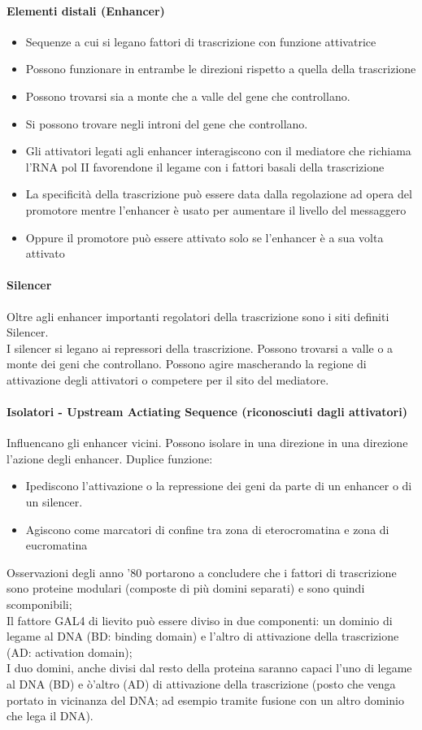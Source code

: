 \documentclass{article}
\begin{document}
\paragraph{Elementi distali (Enhancer)}
\begin{itemize}
    \item Sequenze a cui si legano fattori di trascrizione con funzione attivatrice
    \item Possono funzionare in entrambe le direzioni rispetto a quella della trascrizione
    \item Possono trovarsi sia a monte che a valle del gene che controllano.
    \item Si possono trovare negli introni del gene che controllano.
    \item Gli attivatori legati agli enhancer interagiscono con il mediatore che richiama l'RNA pol II favorendone il legame con i fattori basali della trascrizione
    \item La specificità della trascrizione può essere data dalla regolazione ad opera del promotore mentre l'enhancer è usato per aumentare il livello del messaggero
    \item Oppure il promotore può essere attivato solo se l'enhancer è a sua volta attivato
\end{itemize}
\paragraph{Silencer}
Oltre agli enhancer importanti regolatori della trascrizione sono i siti definiti Silencer.\\
I silencer si legano ai repressori della trascrizione. Possono trovarsi a valle o a monte dei geni che
controllano. Possono agire mascherando la regione di attivazione degli attivatori o competere per il sito del mediatore.
\paragraph{Isolatori - Upstream Actiating Sequence (riconosciuti dagli attivatori)}
Influencano gli enhancer vicini. Possono isolare in una direzione in una direzione l'azione degli enhancer.
Duplice funzione:
\begin{itemize}
    \item Ipediscono l'attivazione o la repressione dei geni da parte di un enhancer o di un silencer.
    \item Agiscono come marcatori di confine tra zona di eterocromatina e zona di eucromatina
\end{itemize}
Osservazioni degli anno '80 portarono a concludere che i fattori di trascrizione sono proteine modulari (composte di più domini separati) e sono quindi scomponibili;\\
Il fattore GAL4 di lievito può essere diviso in due componenti: un dominio di legame al DNA (BD: binding domain) e l'altro di attivazione della trascrizione (AD: activation domain);\\
I duo domini, anche divisi dal resto della proteina saranno capaci l'uno di legame al DNA (BD) e ò'altro (AD) di attivazione della trascrizione (posto che venga portato in vicinanza del DNA; ad esempio tramite fusione con un altro dominio che lega il DNA).
\end{document}
